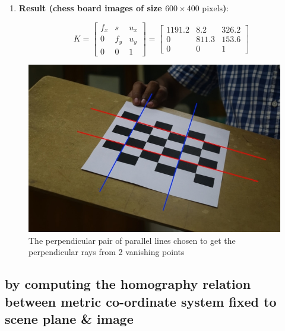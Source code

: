 \documentclass[fleqn]{article}
\begin{document}
\begin{enumerate}
\item \textbf{Result (chess board images of size $600 \times 400 \text{ pixels}$)}:

\[
 K = \begin{bmatrix}
   		f_x & s & u_x \\
   		0 & f_y & u_y \\
   		0 & 0 & 1
   \end{bmatrix}
=    \begin{bmatrix}
   		1191.2 & 8.2 & 326.2 \\
   		0 & 811.3 & 153.6 \\
   		0 & 0 & 1
   \end{bmatrix}
\]

\end{enumerate}

\begin{figure}[!ht]
\centering
\includegraphics[scale=0.4]{./pics/cb1_perp}
\caption{The perpendicular pair of parallel lines chosen to get the perpendicular rays from 2 vanishing points \label{chessboard_perpendicular}}
\end{figure}

\subsection{by computing the homography relation between metric co-ordinate system fixed to scene plane \& image}
\end{document}

